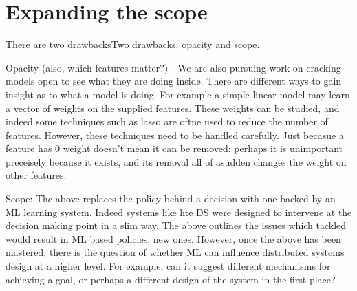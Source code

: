 \documentclass[a4paper,twocolumn]{article}
\newcommand{\ignore}[1]{}
\begin{document}

\section{Expanding the scope}

There are two drawbacksTwo drawbacks: opacity and scope.

Opacity (also, which features matter?)
- We are also pursuing work on cracking models open to see what they are doing inside.
There are different ways to gain insight as to what a model is doing. For example a simple
linear model may learn a vector of weights on the supplied features. These weights can be
studied, and indeed some techniques such as lasso are oftne used to reduce the number of features. However, these
techniques need to be handled carefully. Just becasue a feature has 0 weight doesn't mean it
can be removed: perhaps it is unimportant preceisely because it exists, and its removal all of
asudden changes the weight on other features.


\ignore{
contextual multi-armed bandits. idea is to provide a context, get an action,
and only observe reward for that action. This matches the dist systems world well. It will generate new
policies using ML that we could not come up with by just thinking, and may not
even be able to describe. We argue in favor of opacity and rely instead on the guarantees
provided by the ML optimization.
}


Scope:
The above replaces the policy behind a decision with one backed by an ML learning system.
Indeed systems like hte DS were designed to intervene at the decision making point in a
slim way. The above outlines the issues which tackled would result in ML based policies,
new ones. However, once the above has been mastered, there is the question of whether ML
can influence distributed systems design at a higher level. For example, can it suggest
different mechanisms for achieving a goal, or perhaps a different design of the system in the first place?
\end{document}

